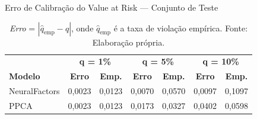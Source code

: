 \begin{table}[H]
\centering
\caption{Erro de Calibração do Value at Risk — Conjunto de Teste}
\label{tab:var}
\begin{tabular}{lcccccc}
\hline
 & \multicolumn{2}{c}{\textbf{q = 1\%}}
 & \multicolumn{2}{c}{\textbf{q = 5\%}}
 & \multicolumn{2}{c}{\textbf{q = 10\%}} \\
\cmidrule(lr){2-3} \cmidrule(lr){4-5} \cmidrule(lr){6-7}
\textbf{Modelo}
  & \textbf{Erro} & \textbf{Emp.}
  & \textbf{Erro} & \textbf{Emp.}
  & \textbf{Erro} & \textbf{Emp.} \\
\hline
NeuralFactors & 0{,}0023 & 0{,}0123 & 0{,}0070 & 0{,}0570 & 0{,}0097 & 0{,}1097 \\
PPCA          & 0{,}0023 & 0{,}0123 & 0{,}0173 & 0{,}0327 & 0{,}0402 & 0{,}0598 \\
\hline
\end{tabular}
\caption*{%
  \textit{Erro} = $|\hat{q}_{\text{emp}} - q|$, onde $\hat{q}_{\text{emp}}$ é a taxa de violação empírica.
  Fonte: Elaboração própria.}
\end{table}
